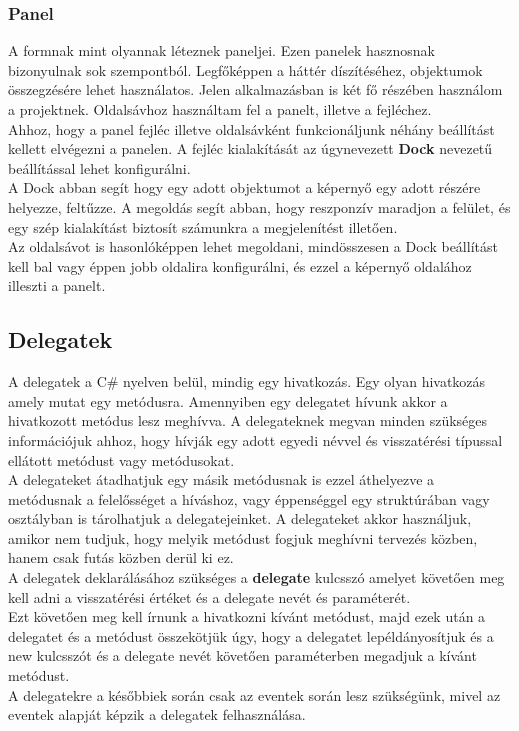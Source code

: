 \documentclass[tocnopagenum]{thesis-ekf}
\theoremstyle{definition}
\theoremstyle{remark}
\begin{document}
	\subsubsection{Panel}
	\label{Panel}
	A formnak mint olyannak léteznek paneljei. Ezen panelek hasznosnak bizonyulnak sok szempontból. Legfőképpen a háttér díszítéséhez, objektumok összegzésére lehet használatos. Jelen alkalmazásban is két fő részében használom a projektnek. 
	Oldalsávhoz használtam fel a panelt, illetve a fejléchez. 
	\\
	Ahhoz, hogy a panel fejléc illetve oldalsávként funkcionáljunk néhány beállítást kellett elvégezni a panelen. A fejléc kialakítását az úgynevezett \textbf{Dock} nevezetű beállítással lehet konfigurálni. 
	 \\
	 A Dock abban segít hogy egy adott objektumot a képernyő egy adott részére helyezze, feltűzze. A megoldás segít abban, hogy reszponzív maradjon a felület, és egy szép kialakítást biztosít számunkra a megjelenítést illetően.
	 \\
	 Az oldalsávot is hasonlóképpen lehet megoldani, mindösszesen a Dock beállítást kell bal vagy éppen jobb oldalira konfigurálni, és ezzel a képernyő oldalához illeszti a panelt.
	\subsection{Delegatek}
	\label{Delegateek}
	A delegatek a C\# nyelven belül, mindig egy hivatkozás. Egy olyan hivatkozás amely mutat egy metódusra. Amennyiben egy delegatet hívunk akkor a hivatkozott metódus lesz meghívva. A delegateknek megvan minden szükséges információjuk ahhoz, hogy hívják egy adott egyedi névvel és visszatérési típussal ellátott metódust vagy metódusokat.
	\\
	A delegateket átadhatjuk egy másik metódusnak is ezzel áthelyezve a metódusnak a felelősséget a híváshoz, vagy éppenséggel egy struktúrában vagy osztályban is tárolhatjuk a delegatejeinket. A delegateket akkor használjuk, amikor nem tudjuk, hogy melyik metódust fogjuk meghívni tervezés közben, hanem csak futás közben derül ki ez.
	\\
	A delegatek deklarálásához szükséges a \textbf{delegate} kulcsszó amelyet követően meg kell adni a visszatérési értéket és a delegate nevét és paraméterét.
	\\ 
	Ezt követően meg kell írnunk a hivatkozni kívánt metódust, majd ezek után a delegatet és a metódust összekötjük úgy, hogy a delegatet lepéldányosítjuk és a new kulcsszót és a delegate nevét követően paraméterben megadjuk a kívánt metódust. 
	\\
	A delegatekre a későbbiek során csak az eventek során lesz szükségünk, mivel az eventek alapját képzik a delegatek felhasználása.
\end{document}
